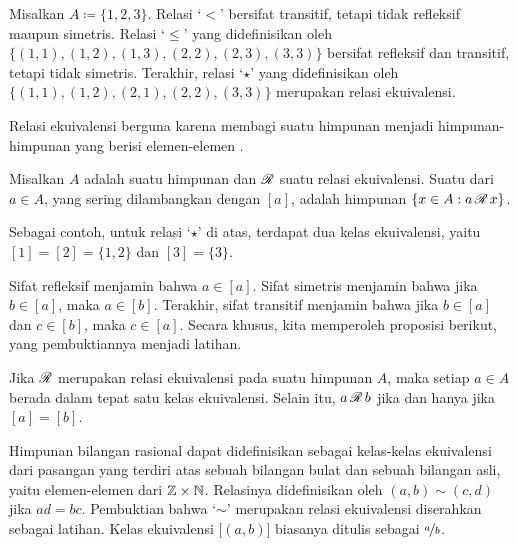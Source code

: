 \begin{example}
Misalkan $A \coloneqq \{ 1,2,3 \}$.
Relasi `$<$' bersifat transitif, tetapi tidak refleksif maupun simetris.  Relasi
`$\leq$' yang didefinisikan oleh
$\bigl\{ (1,1), (1,2), (1,3), (2,2), (2,3), (3,3) \bigr\}$
bersifat refleksif dan transitif, tetapi tidak simetris.
Terakhir, relasi `$\star$' yang didefinisikan oleh
$\bigl\{ (1,1), (1,2), \allowbreak (2,1), \allowbreak (2,2), \allowbreak (3,3) \bigr\}$
merupakan relasi ekuivalensi.
\end{example}

Relasi ekuivalensi berguna karena membagi suatu himpunan menjadi
himpunan-himpunan yang berisi elemen-elemen .

\begin{defn}
Misalkan $A$ adalah suatu himpunan dan ${\mathscr{R}}$ suatu relasi ekuivalensi.
Suatu \emph{} dari $a \in A$, yang sering dilambangkan
dengan $[a]$, adalah himpunan $\{ x \in A : a\, {\mathscr{R}} \, x \}$.
\end{defn}

Sebagai contoh, untuk relasi `$\star$' di atas, terdapat dua kelas ekuivalensi,
yaitu $[1] = [2] = \{ 1,2 \}$ dan $[3] = \{ 3 \}$.

Sifat refleksif menjamin bahwa $a \in [a]$.  Sifat simetris menjamin
bahwa jika $b \in [a]$, maka $a \in [b]$.  Terakhir, sifat transitif menjamin
bahwa jika $b \in [a]$ dan $c \in [b]$, maka $c \in [a]$.
Secara khusus, kita memperoleh proposisi berikut, yang pembuktiannya menjadi
latihan.

\begin{prop} \label{prop:equivclasses}
Jika ${\mathscr{R}}$ merupakan relasi ekuivalensi pada suatu himpunan $A$,
maka setiap $a \in A$ berada dalam tepat satu
kelas ekuivalensi.  Selain itu, $a\, {\mathscr{R}} \, b$ jika dan hanya jika $[a] = [b]$.
\end{prop}

\begin{example} \label{example:ratnums}
Himpunan bilangan rasional dapat didefinisikan sebagai kelas-kelas ekuivalensi
dari pasangan yang terdiri atas sebuah bilangan bulat dan sebuah bilangan asli,
yaitu elemen-elemen dari ${\mathbb{Z}} \times {\mathbb{N}}$.  Relasinya didefinisikan oleh
$(a,b) \sim (c,d)$ jika $ad = bc$.
Pembuktian bahwa `$\sim$' merupakan relasi ekuivalensi diserahkan sebagai latihan.
Kelas ekuivalensi $\bigl[(a,b)\bigr]$ biasanya ditulis sebagai $\nicefrac{a}{b}$.
\end{example}

